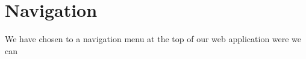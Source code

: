 \section{Navigation}
We have chosen to a navigation menu at the top of our web application were we can